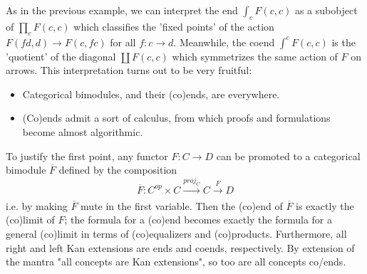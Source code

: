 As in the previous example, we can interpret the end $\int_{c} F(c,c)$ as a subobject of $\prod_c F(c,c)$ which classifies the 'fixed points' of the action $F(fd,d)\rightarrow F(c,fc)$ for all $f:c\rightarrow d$. Meanwhile, the coend $\int^c F(c,c)$ is the 'quotient' of the diagonal $\coprod F(c,c)$ which symmetrizes the same action of $F$ on arrows. This interpretation turns out to be very fruitful:
\begin{itemize}
    \item Categorical bimodules, and their (co)ends, are everywhere. 
    \item (Co)ends admit a sort of calculus, from which proofs and formulations become almost algorithmic.
\end{itemize}

To justify the first point, any functor $F:C\rightarrow D$ can be promoted to a categorical bimodule $\overline{F}$ defined by the composition $$\overline{F}:C^{op}\times C\xrightarrow[]{proj_C}C\xrightarrow[]{F} D$$ i.e. by making $\overline{F}$ mute in the first variable. Then the (co)end of $\overline{F}$ is exactly the (co)limit of $F$; the formula for a (co)end becomes exactly the formula for a general (co)limit in terms of (co)equalizers and (co)products. Furthermore, all right and left Kan extensions are ends and coends, respectively. By extension of the mantra "all concepts are Kan extensions", so too are all concepts co/ends.

